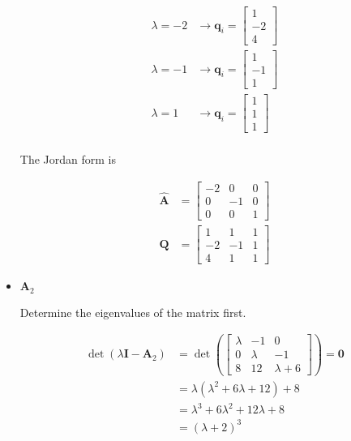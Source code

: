 \begin{itemize}
\begin{align*}
\lambda = -2 & \rightarrow \mathbf{q}_i = \begin{bmatrix}
                                           1\\-2\\4
                                          \end{bmatrix}\\
\lambda = -1 & \rightarrow \mathbf{q}_i = \begin{bmatrix}
                                          1\\-1\\1
                                          \end{bmatrix}\\
\lambda = 1 & \rightarrow \mathbf{q}_i = \begin{bmatrix}
                                           1\\1\\1
                                          \end{bmatrix}\\
 \end{align*}


 The Jordan form is

  \begin{align*}
 \hat {\mathbf{A}} &= \begin{bmatrix}
                       -2 & 0 & 0\\
                       0 & -1 & 0\\
                       0 & 0 & 1
                      \end{bmatrix}\\
  \mathbf{Q} &= \begin{bmatrix}
                    1 & 1 & 1\\
                    -2 & -1 & 1\\
                    4 & 1 & 1
  \end{bmatrix}
 \end{align*}

 \item $\mathbf{A}_2$

 Determine the eigenvalues of the matrix first.

  \begin{align*}
  \det(\lambda \mathbf{I} - \mathbf{A}_2) &=
  \det(\begin{bmatrix}
       \lambda & -1 & 0 \\
       0 & \lambda & -1 \\
       8 & 12 & \lambda+6
      \end{bmatrix})=\mathbf{0}\\
      &= \lambda (\lambda^2 +6\lambda +12) +8\\
      &= \lambda^3 +6 \lambda^2 +12 \lambda +8\\
      &= (\lambda +2)^3
 \end{align*}


\end{itemize}
